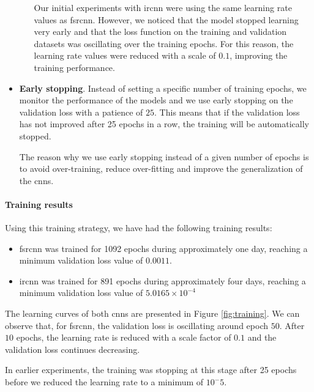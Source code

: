 \begin{itemize}
\begin{itemize}
		Our initial experiments with \gls{ircnn} were using the same learning rate values as \gls{fsrcnn}. However, we noticed that the model stopped learning very early and that the loss function on the training and validation datasets was oscillating over the training epochs. For this reason, the learning rate values were reduced with a scale of $0.1$, improving the training performance.
	\end{itemize}
    \item \textbf{Early stopping}. Instead of setting a specific number of training epochs, we monitor the performance of the models and we use early stopping on the validation loss with a patience of $25$. This means that if the validation loss has not improved after 25 epochs in a row, the training will be automatically stopped.
    
    The reason why we use early stopping instead of a given number of epochs is to avoid over-training,   reduce over-fitting and improve the generalization of the \glspl{cnn}.

\end{itemize}

\paragraph{Training results}
Using this training strategy, we have had the following training results:
\begin{itemize}
	\item \gls{fsrcnn} was trained for 1092 epochs during approximately one day, reaching a minimum validation loss value of $0.0011$.
	\item \gls{ircnn} was trained for 891 epochs during approximately four days, reaching a minimum validation loss value of $5.0165\times10^{-4}$
\end{itemize}

The learning curves of both \glspl{cnn} are presented in Figure \ref{fig:training}. We can observe that, for \gls{fsrcnn}, the validation loss is oscillating around epoch $50$. After $10$ epochs, the learning rate is reduced with a scale factor of $0.1$ and the validation loss continues decreasing.

In earlier experiments, the training was stopping at this stage after 25 epochs before we reduced the learning rate to a minimum of $10^-5$.

